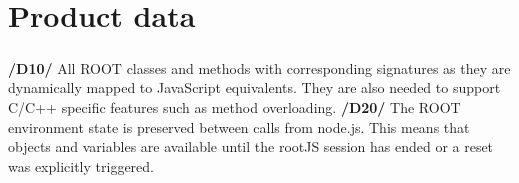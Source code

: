 \chapter{Product data}

\paragraph{}
\textbf{/D10/}
All ROOT classes and methods with corresponding signatures as they are dynamically mapped to JavaScript equivalents. They are also needed to support C/C++ specific features such as method overloading.
\textbf{/D20/}
The ROOT environment state is preserved between calls from node.js. This means that objects and variables are available until the rootJS session has ended or a reset was explicitly triggered.
